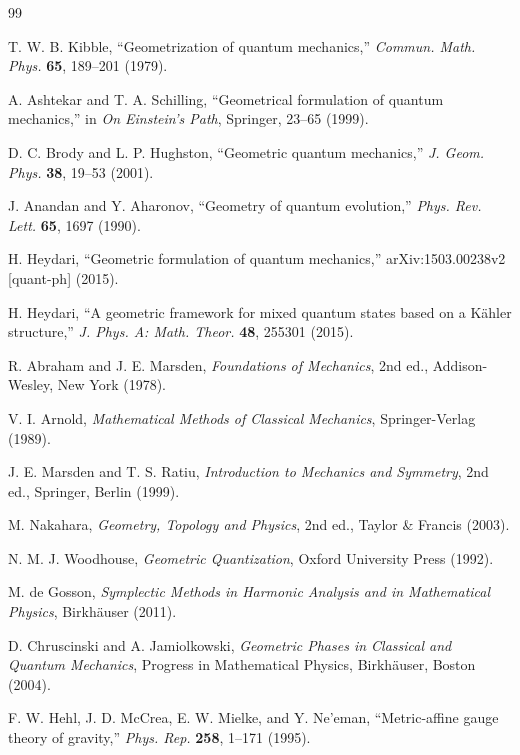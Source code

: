 \documentclass[11pt, a4paper]{article}
\begin{document}
\begin{thebibliography}{99}

T. W. B. Kibble, ``Geometrization of quantum mechanics,'' \textit{Commun. Math. Phys.} \textbf{65}, 189--201 (1979).

A. Ashtekar and T. A. Schilling, ``Geometrical formulation of quantum mechanics,'' in \textit{On Einstein’s Path}, Springer, 23--65 (1999).

D. C. Brody and L. P. Hughston, ``Geometric quantum mechanics,'' \textit{J. Geom. Phys.} \textbf{38}, 19--53 (2001).

J. Anandan and Y. Aharonov, ``Geometry of quantum evolution,'' \textit{Phys. Rev. Lett.} \textbf{65}, 1697 (1990).

H. Heydari, ``Geometric formulation of quantum mechanics,'' arXiv:1503.00238v2 [quant-ph] (2015).

H. Heydari, ``A geometric framework for mixed quantum states based on a K\"ahler structure,'' \textit{J. Phys. A: Math. Theor.} \textbf{48}, 255301 (2015).

R. Abraham and J. E. Marsden, \textit{Foundations of Mechanics}, 2nd ed., Addison-Wesley, New York (1978).

V. I. Arnold, \textit{Mathematical Methods of Classical Mechanics}, Springer-Verlag (1989).

J. E. Marsden and T. S. Ratiu, \textit{Introduction to Mechanics and Symmetry}, 2nd ed., Springer, Berlin (1999).

M. Nakahara, \textit{Geometry, Topology and Physics}, 2nd ed., Taylor \& Francis (2003).

N. M. J. Woodhouse, \textit{Geometric Quantization}, Oxford University Press (1992).

M. de Gosson, \textit{Symplectic Methods in Harmonic Analysis and in Mathematical Physics}, Birkh\"auser (2011).

D. Chruscinski and A. Jamiolkowski, \textit{Geometric Phases in Classical and Quantum Mechanics}, Progress in Mathematical Physics, Birkh\"auser, Boston (2004).

F. W. Hehl, J. D. McCrea, E. W. Mielke, and Y. Ne'eman, ``Metric-affine gauge theory of gravity,'' \textit{Phys. Rep.} \textbf{258}, 1--171 (1995).


\end{thebibliography}
\end{document}
